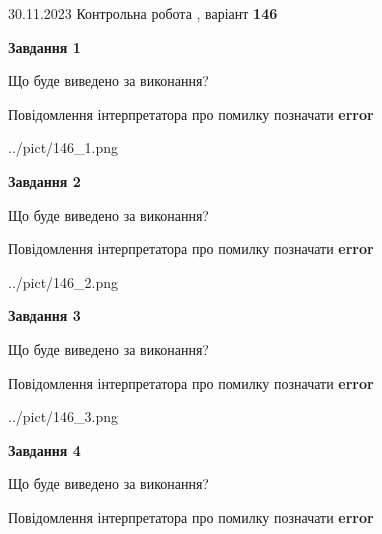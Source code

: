 \documentclass[12pt, ukrainian]{article}
\begin{document}
{{30.11.2023 Контрольна робота , варіант  \No \textbf { 146 }\par}}
{




{\begin {center}\textbf{Завдання 1}\end {center}}\par
Що буде виведено за виконання? \par
Повідомлення інтерпретатора про помилку позначати \textbf{error}

\begin{center}
	{../pict/146_1.png}
\end{center}
\newpage

{\begin {center}\textbf{Завдання 2}\end {center}}\par
Що буде виведено за виконання? \par
Повідомлення інтерпретатора про помилку позначати \textbf{error}

\begin{center}
	{../pict/146_2.png}
\end{center}
\newpage

{\begin {center}\textbf{Завдання 3}\end {center}}\par
Що буде виведено за виконання? \par
Повідомлення інтерпретатора про помилку позначати \textbf{error}

\begin{center}
	{../pict/146_3.png}
\end{center}
\newpage

{\begin {center}\textbf{Завдання 4}\end {center}}\par
Що буде виведено за виконання? \par
Повідомлення інтерпретатора про помилку позначати \textbf{error}

}
\end{document}

